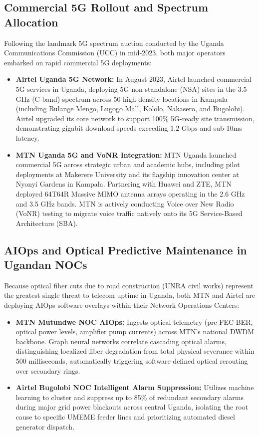 \documentclass[12pt,a4paper]{report}
\begin{document}
\subsection{Commercial 5G Rollout and Spectrum Allocation}
Following the landmark 5G spectrum auction conducted by the Uganda Communications Commission (UCC) in mid-2023, both major operators embarked on rapid commercial 5G deployments:
\begin{itemize}
    \item \textbf{Airtel Uganda 5G Network:} In August 2023, Airtel launched commercial 5G services in Uganda, deploying 5G non-standalone (NSA) sites in the 3.5 GHz (C-band) spectrum across 50 high-density locations in Kampala (including Bulange Mengo, Lugogo Mall, Kololo, Nakasero, and Bugolobi). Airtel upgraded its core network to support 100\% 5G-ready site transmission, demonstrating gigabit download speeds exceeding $1.2\text{ Gbps}$ and sub-10ms latency.
    \item \textbf{MTN Uganda 5G and VoNR Integration:} MTN Uganda launched commercial 5G across strategic urban and academic hubs, including pilot deployments at Makerere University and its flagship innovation center at Nyonyi Gardens in Kampala. Partnering with Huawei and ZTE, MTN deployed 64T64R Massive MIMO antenna arrays operating in the 2.6 GHz and 3.5 GHz bands. MTN is actively conducting Voice over New Radio (VoNR) testing to migrate voice traffic natively onto its 5G Service-Based Architecture (SBA).
\end{itemize}

\subsection{AIOps and Optical Predictive Maintenance in Ugandan NOCs}
Because optical fiber cuts due to road construction (UNRA civil works) represent the greatest single threat to telecom uptime in Uganda, both MTN and Airtel are deploying AIOps software overlays within their Network Operations Centers:
\begin{itemize}
    \item \textbf{MTN Mutundwe NOC AIOps:} Ingests optical telemetry (pre-FEC BER, optical power levels, amplifier pump currents) across MTN's national DWDM backbone. Graph neural networks correlate cascading optical alarms, distinguishing localized fiber degradation from total physical severance within 500 milliseconds, automatically triggering software-defined optical rerouting over secondary rings.
    \item \textbf{Airtel Bugolobi NOC Intelligent Alarm Suppression:} Utilizes machine learning to cluster and suppress up to 85\% of redundant secondary alarms during major grid power blackouts across central Uganda, isolating the root cause to specific UMEME feeder lines and prioritizing automated diesel generator dispatch.
\end{itemize}
\end{document}

